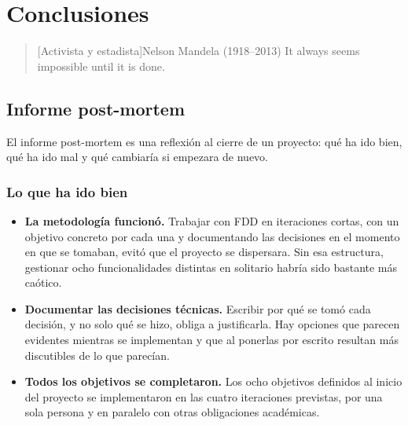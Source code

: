 \chapter{Conclusiones}

\begin{quotation}[Activista y estadista]{Nelson Mandela (1918--2013)}
It always seems impossible until it is done.
\end{quotation}

\begin{abstract}
Este capítulo cierra el proyecto con una valoración de lo que ha funcionado, lo que se haría distinto, y las líneas de trabajo que quedan abiertas para el futuro.
\end{abstract}

\section{Informe post-mortem}

El informe post-mortem es una reflexión al cierre de un proyecto: qué ha ido bien, qué ha ido mal y qué cambiaría si empezara de nuevo.

\subsection{Lo que ha ido bien}

\begin{itemize}

\item \textbf{La metodología funcionó.} Trabajar con FDD en iteraciones cortas, con un objetivo concreto por cada una y documentando las decisiones en el momento en que se tomaban, evitó que el proyecto se dispersara. Sin esa estructura, gestionar ocho funcionalidades distintas en solitario habría sido bastante más caótico.

\item \textbf{Documentar las decisiones técnicas.} Escribir por qué se tomó cada decisión, y no solo qué se hizo, obliga a justificarla. Hay opciones que parecen evidentes mientras se implementan y que al ponerlas por escrito resultan más discutibles de lo que parecían.

\item \textbf{Todos los objetivos se completaron.} Los ocho objetivos definidos al inicio del proyecto se implementaron en las cuatro iteraciones previstas, por una sola persona y en paralelo con otras obligaciones académicas.

\end{itemize}

